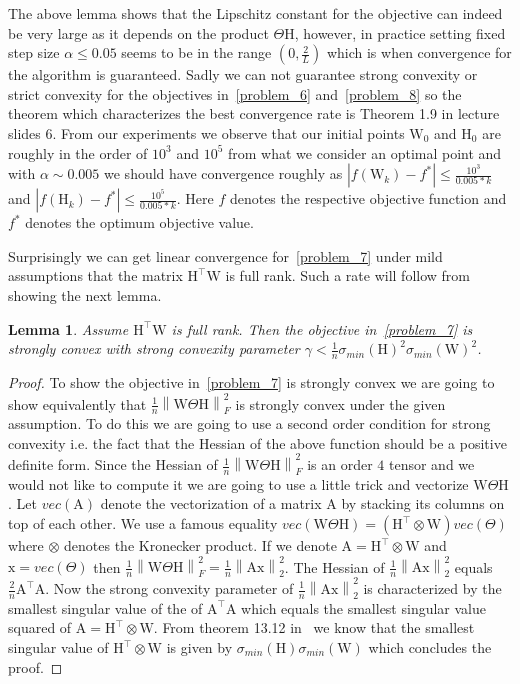 \documentclass{article}
\newcommand{\0}{\mathrm{0}}
\newcommand{\1}{\mathrm{1}}
\newcommand{\A}{\mathrm{A}}
\renewcommand{\H}{\mathrm{H}}
\newcommand{\W}{\mathrm{W}}
\newcommand{\x}{\mathrm{x}}
\newcommand{\norm}[1]{\left\| #1 \right\|}
\newtheorem{lemma}[theorem]{Lemma}
\begin{document}
The above lemma shows that the Lipschitz constant for the objective can indeed be very large as it depends on the product $\Theta\H$, however, in practice setting fixed step size $\alpha \leq 0.05$ seems to be in the range $(0,\frac{2}{L})$ which is when convergence for the algorithm is guaranteed. Sadly we can not guarantee strong convexity or strict convexity for the objectives in~\ref{problem_6} and~\ref{problem_8} so the theorem which characterizes the best convergence rate is Theorem 1.9 in lecture slides 6. From our experiments we observe that our initial points $\W_0$ and $\H_0$ are roughly in the order of $10^3$ and $10^5$ from what we consider an optimal point and with $\alpha\sim 0.005$ we should have convergence roughly as $|f(\W_k) - f^*| \leq \frac{10^3}{0.005*k}$ and $|f(\H_k) - f^*| \leq \frac{10^5}{0.005*k}$. Here $f$ denotes the respective objective function and $f^*$ denotes the optimum objective value.
\par
Surprisingly we can get linear convergence for~\ref{problem_7} under mild assumptions that the matrix $\H^\top \W$ is full rank. Such a rate will follow from showing the next lemma.
\begin{lemma}
  Assume $\H^\top \W$ is full rank. Then the objective in~\ref{problem_7} is strongly convex with strong convexity parameter $\gamma < \frac{1}{n}\sigma_{min}(\H)^2\sigma_{min}(\W)^2$.
\end{lemma}
\begin{proof}
To show the objective in~\ref{problem_7} is strongly convex we are going to show equivalently that $\frac{1}{n}\norm{\W\Theta\H}_F^2$ is strongly convex under the given assumption. To do this we are going to use a second order condition for strong convexity i.e. the fact that the Hessian of the above function should be a positive definite form. Since the Hessian of $\frac{1}{n}\norm{\W\Theta\H}_F^2$ is an order $4$ tensor and we would not like to compute it we are going to use a little trick and vectorize $\W\Theta\H$. Let $vec(\A)$ denote the vectorization of a matrix $\A$ by stacking its columns on top of each other. We use a famous equality $vec\left(\W\Theta\H\right) = \left(\H^\top\otimes\W\right)vec(\Theta)$ where $\otimes$ denotes the Kronecker product. If we denote $\A = \H^\top\otimes\W$ and $\x = vec(\Theta)$ then $\frac{1}{n}\norm{\W\Theta\H}_F^2 = \frac{1}{n}\norm{\A\x}_2^2$. The Hessian of $\frac{1}{n}\norm{\A\x}_2^2$ equals $\frac{2}{n}\A^\top\A$. Now the strong convexity parameter of $\frac{1}{n}\norm{\A\x}_2^2$ is characterized by the smallest singular value of the of $\A^\top\A$ which equals the smallest singular value squared of $\A=\H^\top\otimes\W$. From theorem 13.12 in~\cite{laub2005matrix} we know that the smallest singular value of $\H^\top\otimes\W$ is given by $\sigma_{min}(\H)\sigma_{min}(\W)$ which concludes the proof.
\end{proof}
\end{document}
